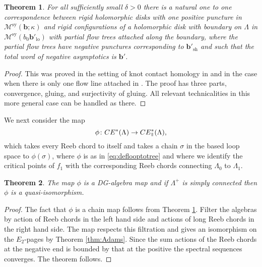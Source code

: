 \documentclass{gtpart}
\newtheorem{thm}{Theorem}
\newcommand{\sy}{\mathrm{sy}}
\renewcommand{\parallel}{{\mkern3mu\vphantom{\perp}\vrule depth 0pt\mkern2mu\vrule depth
0pt\mkern3mu}}
\begin{document}
\begin{thm}\label{t:quantumflowtree}
	For all sufficiently small $\delta>0$ there is a natural one to one correspondence between rigid holomorphic disks with one positive puncture in $\mathcal{M}^{\sy}(\mathbf{b};\kappa)$ and rigid configurations of a holomorphic disk with boundary on $\Lambda$ in $\mathcal{M}^{\sy}(b_{0}\mathbf{b}'_{\mathrm{lo}})$ with partial flow trees attached along the boundary, where the partial flow trees have negative punctures corresponding to $\mathbf{b}'_{\mathrm{sh}}$ and such that the total word of negative asymptotics is $\mathbf{b}'$. 
\end{thm} 

\begin{proof}
	This was proved in the setting of knot contact homology in \cite[Corollary 5.14, 5.19, and 5.20]{E} and in the case when there is only one flow line attached in \cite[Theorem 3.6]{EESa}. The proof has three parts, convergence, gluing, and surjectivity of gluing. All relevant technicalities in this more general case can be handled as there. 
\end{proof}

We next consider the map 
\[
\phi\colon CE^{\ast}(\Lambda)\to CE^{\ast}_{\parallel}(\Lambda),
\]
which takes every Reeb chord to itself and takes a chain $\sigma$ in the based loop space to $\phi(\sigma)$, where $\phi$ is as in \eqref{eq:deflooptotree} and where we identify the critical points of $f_{1}$ with the corresponding Reeb chords connecting $\Lambda_{0}$ to $\Lambda_{1}$.

\begin{thm}\label{t:parallel=loops}
	The map $\phi$ is a DG-algebra map and	
	if $\Lambda^{+}$ is simply connected then $\phi$ is a quasi-isomorphism. 		
\end{thm}

\begin{proof}
	The fact that $\phi$ is a chain map follows from Theorem \ref{t:quantumflowtree}.
	Filter the algebras by action of Reeb chords in the left hand side and actions of long Reeb chords in the right hand side. The map respects this filtration and gives an isomorphism on the $E_{2}$-pages by Theorem \ref{thm:Adams}. Since the sum actions of the Reeb chords at the negative end is bounded by that at the positive the spectral sequences converges. The theorem follows.  
\end{proof}
\end{document}
